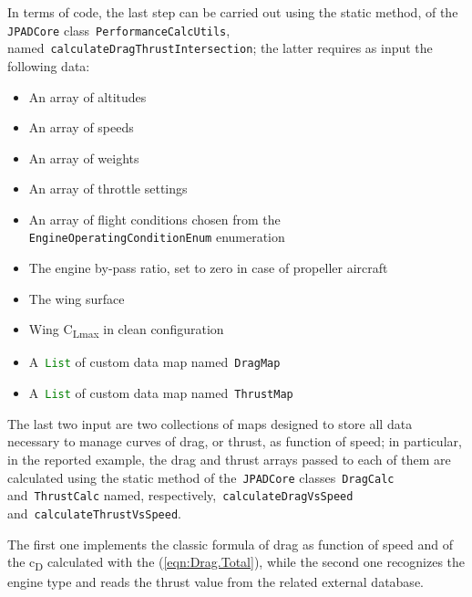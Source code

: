 In terms of code, the last step can be carried out using the static method, of the \lstinline[language=Java]!JPADCore! class~\lstinline[language=Java]!PerformanceCalcUtils!, named~\lstinline[language=Java]!calculateDragThrustIntersection!; the latter requires as input the following data:

\begin{itemize}
\item An array of altitudes
\item An array of speeds
\item An array of weights
\item An array of throttle settings
\item An array of flight conditions chosen from the \lstinline[language=Java]!EngineOperatingConditionEnum! enumeration
\item The engine by-pass ratio, set to zero in case of propeller aircraft
\item The wing surface
\item Wing C\textsubscript{Lmax} in clean configuration
\item A~\lstinline[language=Java]!List! of custom data map named~\lstinline[language=Java]!DragMap!
\item A~\lstinline[language=Java]!List! of custom data map named~\lstinline[language=Java]!ThrustMap!
\end{itemize}

\bigskip
\noindent
The last two input are two collections of maps designed to store all data necessary to manage curves of drag, or thrust, as function of speed; in particular, in the reported example, the drag and thrust arrays passed to each of them are calculated using the static method of the~\lstinline[language=Java]!JPADCore! classes~\lstinline[language=Java]!DragCalc! and~\lstinline[language=Java]!ThrustCalc! named, respectively,~\lstinline[language=Java]!calculateDragVsSpeed! and~\lstinline[language=Java]!calculateThrustVsSpeed!. 

The first one implements the classic formula of drag as function of speed and of the c\textsubscript{D} calculated with the (\ref{eqn:Drag.Total}), while the second one recognizes the engine type and reads the thrust value from the related external database.

